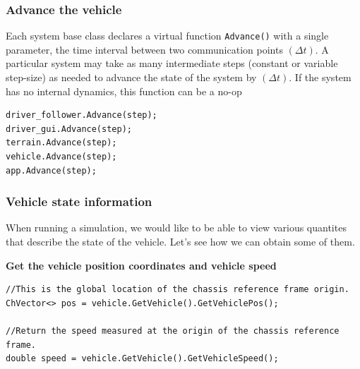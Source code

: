 \subsubsection{Advance the vehicle}

Each system base class declares a virtual function \lstinline{Advance()}
with a single parameter, the time interval between two communication points $(\Delta t)$.
A particular system may take as many intermediate steps (constant or variable step-size) 
as needed to advance the state of the system by $(\Delta t)$.  If the system has no internal dynamics, this function can be a no-op

\begin{lstlisting}
driver_follower.Advance(step);
driver_gui.Advance(step);
terrain.Advance(step);
vehicle.Advance(step);
app.Advance(step);
\end{lstlisting}


\subsubsection{Vehicle state information}

When running a simulation, we would like to be able to view various quantites that describe the state of the vehicle. Let's see how
we can obtain some of them.

\textbf{Get the vehicle position coordinates and vehicle speed}

\begin{lstlisting}
//This is the global location of the chassis reference frame origin. 
ChVector<> pos = vehicle.GetVehicle().GetVehiclePos();

//Return the speed measured at the origin of the chassis reference frame.
double speed = vehicle.GetVehicle().GetVehicleSpeed();
\end{lstlisting}












